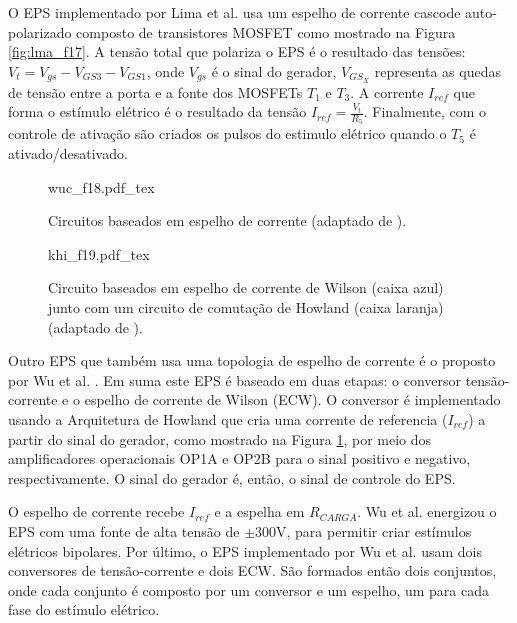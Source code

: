 O EPS implementado por Lima et al. \cite{DeLima2002} usa um espelho de corrente cascode auto-polarizado composto de transistores MOSFET como mostrado na Figura \ref{fig:lma_f17}. A tensão total que polariza o \acrshort{EPS} é o resultado das tensões: $V_{t}= V_{gs} - V_{GS3} - V_{GS1}$, onde $V_{gs}$ é o sinal do gerador, $V_{GS_{X}}$ representa as quedas de tensão entre a porta e a fonte dos MOSFETs $T_{1}$ e $T_{3}$.  A corrente $I_{ref}$ que forma o estímulo elétrico é o resultado da tensão $I_{ref}  = \frac{V_{t}}{R_{5}}$. Finalmente, com o controle de ativação são criados os pulsos do estimulo elétrico quando o $T_{5}$ é ativado/desativado.

\begin{figure}
    \centering %
    \small %
    \def\svgwidth{0.7
    \columnwidth}%
    {wuc_f18.pdf_tex}
    \caption{Circuitos baseados em espelho de corrente (adaptado de \cite{Wu2002}).}
    \label{fig:wuc_f18}
\end{figure}

\begin{figure}
    \centering %
    \small %
    \def\svgwidth{1
    \columnwidth}%
    {khi_f19.pdf_tex}
    \caption{Circuito baseados em espelho de corrente de Wilson (caixa azul) junto com um circuito de comutação de Howland (caixa laranja) (adaptado de \cite{KhosravaniSanaz2011}).}
    \label{fig:khi_f19}
\end{figure}

Outro \acrshort{EPS} que também usa uma topologia de espelho de corrente é o proposto por Wu et al. \cite{Wu2002}. Em suma este \acrshort{EPS} é baseado em duas etapas: o conversor tensão-corrente e o espelho de corrente de Wilson (\acrshort{ECW}). O conversor é implementado usando a Arquitetura de Howland que cria uma corrente de referencia ($I_{ref}$) a partir do sinal do gerador, como mostrado na Figura \ref{fig:wuc_f18}, por meio dos amplificadores operacionais OP1A e OP2B para o sinal positivo e negativo, respectivamente. O sinal do gerador é, então, o sinal de controle do \acrshort{EPS}. 

O espelho de corrente recebe $I_{ref}$ e a espelha em $R_{CARGA}$. Wu et al. energizou o \acrshort{EPS} com uma fonte de alta tensão de $\pm$300V, para permitir criar estímulos elétricos bipolares. Por último, o \acrshort{EPS} implementado por Wu et al. usam dois conversores de tensão-corrente e dois \acrshort{ECW}. São formados então dois conjuntos, onde cada conjunto é composto por um conversor e um espelho, um para cada fase do estímulo elétrico.


